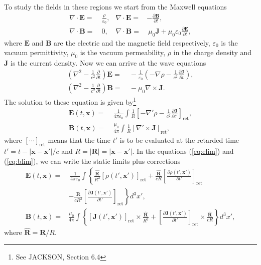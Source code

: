 To study the fields in these regions we start from the Maxwell equations
\begin{align}
\nabla\cdot\boldsymbol{E}= & \ \frac{\rho}{\varepsilon_{0}}, & \nabla\cdot\boldsymbol{E}= & -\frac{\partial\boldsymbol{B}}{\partial t},\\
\nabla\cdot\boldsymbol{B}= & \ 0, & \nabla\cdot\boldsymbol{B}= & \ \mu_{0}\boldsymbol{J}+\mu_{0}\varepsilon_{0}\frac{\partial\boldsymbol{E}}{\partial t},
\end{align}
where $\boldsymbol{E}$ and $\boldsymbol{B}$ are the electric
and the magnetic field respectively, $\varepsilon_{0}$ is the vacuum
permittivity, $\mu_{0}$ is the vacuum permeability, $\rho$ in the
charge density and $\boldsymbol{J}$ is the current density. Now we
can arrive at the wave equations
\begin{align}
\left(\nabla^{2}-\frac{1}{c^{2}}\frac{\partial}{\partial t}\right)\boldsymbol{E}= & \ -\frac{1}{\varepsilon_{0}}\left(-\nabla\rho-\frac{1}{c^{2}}\frac{\partial\boldsymbol{J}}{\partial t}\right),\\
\left(\nabla^{2}-\frac{1}{c^{2}}\frac{\partial}{\partial t}\right)\boldsymbol{B}= & \ -\mu_{0}\nabla\times\boldsymbol{J}.
\end{align}
The solution to these equation is given by\footnote{See JACKSON, Section 6.4}
\begin{align}
\boldsymbol{E}\left(t,\boldsymbol{x}\right)= & \ \frac{1}{4\pi\varepsilon_{0}}\int\frac{1}{R}\left[-\nabla'\rho-\frac{1}{c^{2}}\frac{\partial\boldsymbol{J}}{\partial t'}\right]_{\text{ret}},\label{eq:elim}\\
\boldsymbol{B}\left(t,\boldsymbol{x}\right)= & \ \frac{\mu_{0}}{4\pi}\int\frac{1}{R}\left[\nabla'\times\boldsymbol{J}\right]_{\text{ret}},\label{eq:blim}
\end{align}
where $\left[\cdots\right]_{\text{ret}}$ means that the time $t'$
is to be evaluated at the retarded time $t'=t-\left|\boldsymbol{x}-\boldsymbol{x}'\right|/c$
and $R=\left|\boldsymbol{R}\right|=\left|\boldsymbol{x}-\boldsymbol{x}'\right|$.
In the equations (\ref{eq:elim}) and (\ref{eq:blim}), we can write
the static limits plus corrections
\begin{align}
\boldsymbol{E}\left(t,\boldsymbol{x}\right)= & \ \frac{1}{4\pi\varepsilon_{0}}\int\left\{ \frac{\hat{\boldsymbol{R}}}{R^{2}}\left[\rho\left(t',\boldsymbol{x}'\right)\right]_{\text{ret}}+\frac{\hat{\boldsymbol{R}}}{cR}\left[\frac{\partial\rho\left(t',\boldsymbol{x}'\right)}{\partial t'}\right]_{\text{ret}}\right.\nonumber \\
\  & \left.-\frac{\hat{\boldsymbol{R}}}{cR^{2}}\left[\frac{\partial\boldsymbol{J}\left(t',\boldsymbol{x}'\right)}{\partial t'}\right]_{\text{ret}}\right\} d^{3}x',\label{eq:egen}\\
\boldsymbol{B}\left(t,\boldsymbol{x}\right)= & \frac{\mu_{0}}{4\pi}\int\left\{ \left[\boldsymbol{J}\left(t',\boldsymbol{x}'\right)\right]_{\text{ret}}\times\frac{\hat{\boldsymbol{R}}}{R^{2}}+\left[\frac{\partial\boldsymbol{J}\left(t',\boldsymbol{x}'\right)}{\partial t'}\right]_{\text{ret}}\times\frac{\hat{\boldsymbol{R}}}{cR}\right\} d^{3}x',
\end{align}
where $\hat{\boldsymbol{R}}=\boldsymbol{R}/R$.

